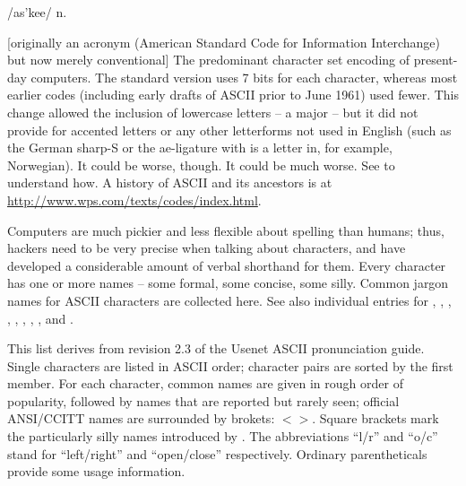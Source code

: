  /as'kee/ n.

[originally an acronym (American Standard Code for Information Interchange) but now merely conventional] The predominant character set
encoding of present-day computers. The standard version uses 7 bits for each character, whereas most earlier codes (including early drafts
of ASCII prior to June 1961) used fewer. This change allowed the inclusion of lowercase letters -- a major  -- but it did not
provide for accented letters or any other letterforms not used in English (such as the German sharp-S or the ae-ligature with is a letter
in, for example, Norwegian). It could be worse, though. It could be much worse. See  to understand how. A history of ASCII
and its ancestors is at \url{http://www.wps.com/texts/codes/index.html}.

Computers are much pickier and less flexible about spelling than humans; thus, hackers need to be very precise when talking about
characters, and have developed a considerable amount of verbal shorthand for them. Every character has one or more names -- some formal,
some concise, some silly. Common jargon names for ASCII characters are collected here. See also individual entries for ,
, , , , , , , and
.

This list derives from revision 2.3 of the Usenet ASCII pronunciation guide. Single characters are listed in ASCII order; character pairs
are sorted by the first member. For each character, common names are given in rough order of popularity, followed by names that are reported
but rarely seen; official ANSI/CCITT names are surrounded by brokets: $<$$>$. Square brackets mark the particularly silly names introduced
by . The abbreviations ``l/r'' and ``o/c'' stand for ``left/right'' and ``open/close'' respectively. Ordinary
parentheticals provide some usage information.

